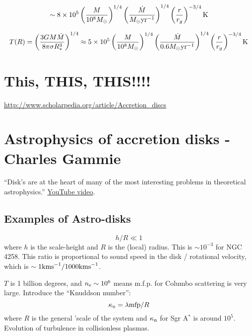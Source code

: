 \documentclass[11pt,a4paper]{article}
\begin{document}
\smallskip
\smallskip
\noindent
\begin{equation*}
  \sim 8 \times 10^{5}    \left(   \frac{M}{10^{8} M_{\odot}}   \right  )^{1/4}  \left(  \frac{\dot{M}}{M_{\odot} {\rm yr^{-1}}}  \right )^{1/4} \left ( \frac{r}{r_{g}} \right )^{-3/4}  {\rm K} \\
\end{equation*}

\smallskip
\smallskip
\noindent
\begin{equation*}
T(R) = \left ( \frac{3 G M \dot{M}}{8 \pi \sigma R^{3}_{*}}  \right )^{1/4}   
  \approx 5 \times 10^{5}    \left(   \frac{M}{10^{8} M_{\odot}}   \right  )^{1/4}  \left(  \frac{\dot{M}}{0.6 M_{\odot} {\rm yr^{-1}}}  \right )^{1/4} \left ( \frac{r}{r_{g}} \right )^{-3/4}  {\rm K} \\
\end{equation*}


\section{This, THIS, THIS!!!!}
\href{http://www.scholarpedia.org/article/Accretion\_discs}{http://www.scholarpedia.org/article/Accretion\_discs}


\newpage
\section{Astrophysics of accretion disks - Charles Gammie}

``Disk's are at the heart of many of the most interesting problems in
theoretical astrophysics.''
\href{https://www.youtube.com/watch?v=5qwyU3_JWE0}{YouTube video}.

\subsection{Examples of Astro-disks}
\begin{equation}
    h / R \ll 1 
\end{equation}
where $h$ is the scale-height and $R$ is the (local) radius.  This is
$\sim10^{-3}$ for NGC 4258.  This ratio is proportional to sound
speed in the disk / rotational velocity, which is $\sim 1 {\rm km
s}^{-1} / 1000 {\rm km s}^{-1}$.

$T$ is 1 billion degrees, and $n_{\rm e} \sim 10^6$ means m.f.p. for
Columbo scattering is very large.  Introduce the ``Knuddson number'':
\begin{equation} \kappa_{\rm n} = \lambda{\rm mfp}/R
\end{equation} where $R$ is the general 'scale of the system and
$\kappa_{\rm n}$ for Sgr A$^*$ is around $10^5$.  Evolution of
turbulence in collisionless plasmas.
\end{document}
